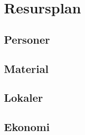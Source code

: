 \documentclass[projektplan/plan.tex]{subfiles}
\begin{document}
\section{Resursplan}
\subsection{Personer}
\subsection{Material}
\subsection{Lokaler}
\subsection{Ekonomi}
\end{document}
